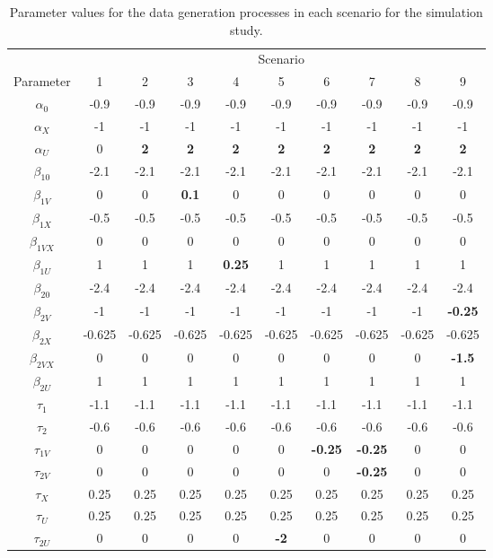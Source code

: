 \begin{appendix}
\begin{table}[p]
    \centering
    \caption{Parameter values for the data generation processes in each scenario for the simulation study.}\label{tab:simparams}
    \begin{tabular}{cccccccccc}
        \toprule
        & \multicolumn{9}{c}{Scenario} \\
        \cmidrule{2-10}
        Parameter & 1 & 2 & 3 & 4 & 5 & 6 & 7 & 8 & 9 \\
        \midrule
        $\alpha_0$ & -0.9 & -0.9 & -0.9 & -0.9 & -0.9 & -0.9 & -0.9 & -0.9 & -0.9 \\
        $\alpha_X$ & -1 & -1 & -1 & -1 & -1 & -1 & -1 & -1 & -1 \\
        $\alpha_U$ & 0 & \textbf{2} & \textbf{2} & \textbf{2} & \textbf{2} & \textbf{2} & \textbf{2} & \textbf{2} & \textbf{2} \\
        $\beta_{10}$ & -2.1 & -2.1 & -2.1 & -2.1 & -2.1 & -2.1 & -2.1 & -2.1 & -2.1 \\
        $\beta_{1V}$ & 0 & 0 & \textbf{0.1} & 0 & 0 & 0 & 0 & 0 & 0 \\
        $\beta_{1X}$ & -0.5 & -0.5 & -0.5 & -0.5 & -0.5 & -0.5 & -0.5 & -0.5 & -0.5 \\
        $\beta_{1VX}$ & 0 & 0 & 0 & 0 & 0 & 0 & 0 & 0 & 0 \\
        $\beta_{1U}$ & 1 & 1 & 1 & \textbf{0.25} & 1 & 1 & 1 & 1 & 1 \\
        $\beta_{20}$ & -2.4 & -2.4 & -2.4 & -2.4 & -2.4 & -2.4 & -2.4 & -2.4 & -2.4 \\
        $\beta_{2V}$ & -1 & -1 & -1 & -1 & -1 & -1 & -1 & -1 & \textbf{-0.25} \\
        $\beta_{2X}$ & -0.625 & -0.625 & -0.625 & -0.625 & -0.625 & -0.625 & -0.625 & -0.625 & -0.625 \\
        $\beta_{2VX}$ & 0 & 0 & 0 & 0 & 0 & 0 & 0 & 0 & \textbf{-1.5} \\
        $\beta_{2U}$ & 1 & 1 & 1 & 1 & 1 & 1 & 1 & 1 & 1 \\
        $\tau_1$ & -1.1 & -1.1 & -1.1 & -1.1 & -1.1 & -1.1 & -1.1 & -1.1 & -1.1 \\
        $\tau_2$ & -0.6 & -0.6 & -0.6 & -0.6 & -0.6 & -0.6 & -0.6 & -0.6 & -0.6 \\
        $\tau_{1V}$ & 0 & 0 & 0 & 0 & 0 & \textbf{-0.25} & \textbf{-0.25} & 0 & 0 \\
        $\tau_{2V}$ & 0 & 0 & 0 & 0 & 0 & 0 & \textbf{-0.25} & 0 & 0 \\
        $\tau_X$ & 0.25 & 0.25 & 0.25 & 0.25 & 0.25 & 0.25 & 0.25 & 0.25 & 0.25 \\
        $\tau_U$ & 0.25 & 0.25 & 0.25 & 0.25 & 0.25 & 0.25 & 0.25 & 0.25 & 0.25 \\
        $\tau_{2U}$ & 0 & 0  & 0  & 0 & \textbf{-2}  & 0  & 0  & 0  & 0  \\
        \bottomrule
    \end{tabular}
\end{table}


\end{appendix}
